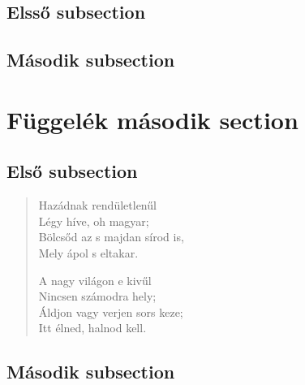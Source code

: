 \documentclass[12pt, twoside]{article}
\begin{document}
\subsection{Elsső subsection}
\quote{\hulipsum[2]}
\subsection{Második subsection}
\quotation{\hulipsum[2]}

\section{Függelék második section}
\subsection{Első subsection}
\begin{verse}
Hazádnak rendületlenűl\\
Légy híve, oh magyar;\\
Bölcsőd az s majdan sírod is,\\
Mely ápol s eltakar.\newline

A nagy világon e kivűl\\
Nincsen számodra hely;\\
Áldjon vagy verjen sors keze;\\
Itt élned, halnod kell.
\end{verse}
\subsection{Második subsection}
\end{document}
